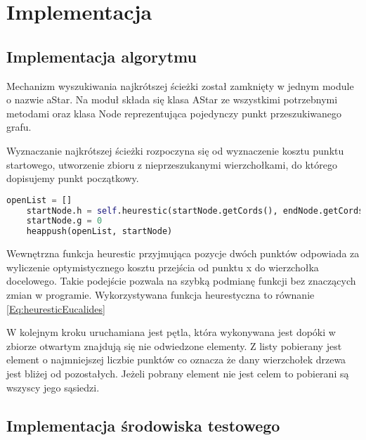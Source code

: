 \section{Implementacja}
\subsection{Implementacja algorytmu}
Mechanizm wyszukiwania najkrótszej ścieżki został zamknięty w jednym module o nazwie aStar.
Na moduł składa się klasa AStar ze wszystkimi potrzebnymi metodami oraz klasa Node reprezentująca 
pojedynczy punkt przeszukiwanego grafu. 

Wyznaczanie najkrótszej ścieżki rozpoczyna się od wyznaczenie kosztu punktu startowego, utworzenie zbioru z nieprzeszukanymi 
wierzchołkami, do którego dopisujemy punkt początkowy. 
\begin{lstlisting}[language=Python,caption=Przygotowanie danych,label={kodPython}]
    openList = []
    startNode.h = self.heurestic(startNode.getCords(), endNode.getCords())
    startNode.g = 0
    heappush(openList, startNode)
\end{lstlisting}

Wewnętrzna funkcja heurestic przyjmująca pozycje dwóch punktów odpowiada
za wyliczenie optymistycznego kosztu przejścia od punktu x do wierzchołka docelowego.
Takie podejście pozwala na szybką podmianę funkcji bez znaczących zmian w programie.
Wykorzystywana funkcja heurestyczna to równanie \eqref{Eq:heuresticEucalides} 

W kolejnym kroku uruchamiana jest pętla, która wykonywana jest dopóki
w zbiorze otwartym znajdują się nie odwiedzone elementy. Z listy pobierany jest 
element o najmniejszej liczbie punktów co oznacza że dany wierzchołek drzewa jest bliżej od pozostałych.
Jeżeli pobrany element nie jest celem to pobierani są wszyscy jego sąsiedzi.

\subsection{Implementacja środowiska testowego}